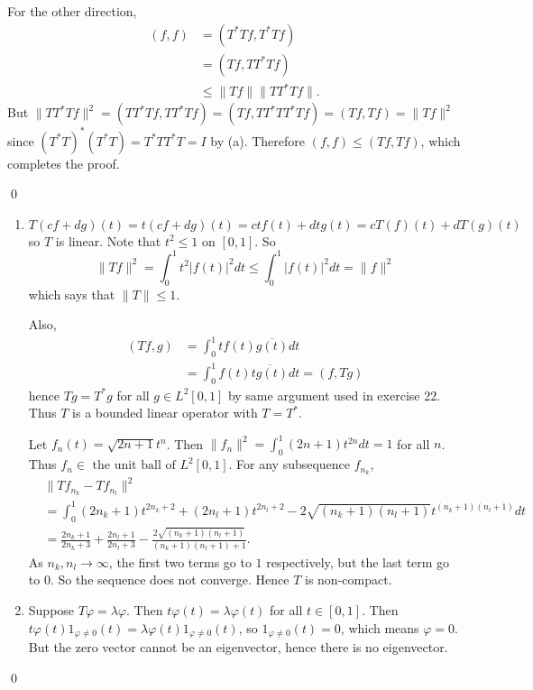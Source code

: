 \begin{exercise}[4.22]
\begin{enumerate}[label = (\alph*)]
			For the other direction,
			\[
				\begin{split}
					(f, f)
					&= (T^* Tf, T^* Tf) \\
					&= (Tf, T T^* Tf) \\
					& \le \| Tf \| \|TT^* Tf \|.
				\end{split}
			\]
			But $\| TT^*Tf \|^2 = (TT^*Tf, TT^*Tf) = (Tf, T T^* T T^* T f) = (Tf, Tf) = \| Tf\|^2$
			since $(T^* T)^* (T^* T) = T^* T T^* T = I$ by (a).
			Therefore $(f, f) \le (Tf, Tf)$, which completes the proof.
	\end{enumerate}
	\qed
\end{exercise}

\begin{exercise}[4.32] \hfill

	\begin{enumerate}[label = (\alph*)]
		\item $T(cf + dg)(t) = t(cf+dg)(t) = ctf(t) + dtg(t) = cT(f)(t) + dT(g)(t)$ so $T$ is linear.
			Note that $t^2 \le 1$ on $[0, 1]$.
			So
			\[
				\| Tf \|^2 = \int_0^1 t^2 |f(t)|^2 dt \le \int_0^1 |f(t)|^2 dt = \| f \|^2
			\]
			which says that $\| T \| \le 1$.

			Also,
			\[
				\begin{split}
					(Tf, g)
					&= \int_0^1 tf(t) \overline{g(t)}dt \\
					&= \int_0^1 f(t) \overline{tg(t)} dt = (f, Tg)
				\end{split}
			\]
			hence $Tg = T^* g$ for all $g \in L^2[0, 1]$ by same argument used in exercise 22.
			Thus $T$ is a bounded linear operator with $T = T^*$.

			Let $f_n(t) = \sqrt{2n+1} t^n$.
			Then $\| f_n \| ^2 = \int_0^1 (2n+1)t^{2n} dt = 1$ for all $n$.
			Thus $f_n \in \text{ the unit ball of }L^2[0, 1]$.
			For any subsequence $f_{n_k}$,
			\[
				\begin{split}
					&\| Tf_{n_k} - Tf_{n_l} \|^2 \\
					&= \int_0^1 (2n_k + 1)t^{2n_k + 2} +(2n_l + 1)t^{2n_l + 2} - 2\sqrt{(n_k+1)(n_l+1)}t^{(n_k+1)(n_l+1)} dt \\
					&= \frac{2n_k+1}{2n_k +3} + \frac{2n_l + 1}{2n_l + 3} - \frac{2\sqrt{(n_k+1)(n_l+1)}}{(n_k+1)(n_l+1)+1}.
				\end{split}
			\]
			As $n_k, n_l \rightarrow \infty$, the first two terms go to $1$ respectively, but the last term go to $0$.
			So the sequence does not converge.
			Hence $T$ is non-compact.

		\item Suppose $T \varphi = \lambda \varphi$.
			Then $t\varphi(t) = \lambda \varphi(t)$ for all $t \in [0, 1]$.
			Then $t \varphi(t) 1_{\varphi\ne0}(t) = \lambda \varphi(t) 1_{\varphi \ne 0}(t)$,
			so $1_{\varphi \ne 0}(t) = 0$, which means $\varphi = 0$.
			But the zero vector cannot be an eigenvector, hence there is no eigenvector.

	\end{enumerate}
	\qed
\end{exercise}

